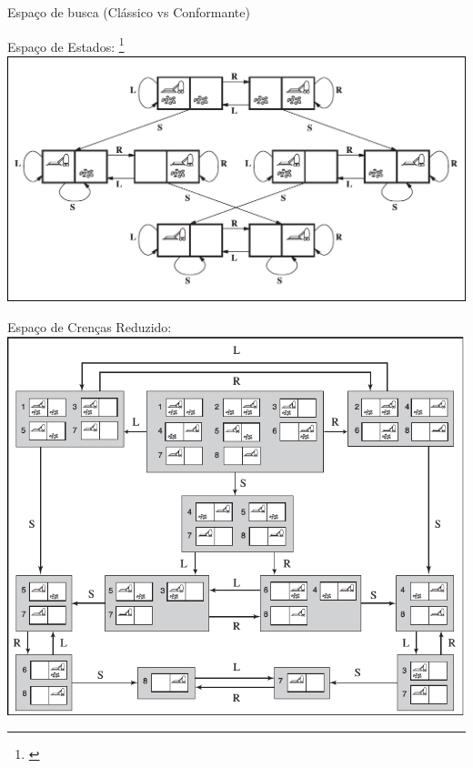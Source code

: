 \begin{frame}{Espaço de busca (Clássico vs Conformante)}

    \begin{multicols}{2}
        \centering
    
        Espaço de Estados: \footnote{\cite{AIMA2013}}
        \includegraphics[scale=0.2]{images/space_of_states.png}
    \columnbreak
    
        Espaço de Crenças Reduzido:
        \includegraphics[scale=0.28]{images/belief_space.png}
    \end{multicols}
    
\end{frame}


